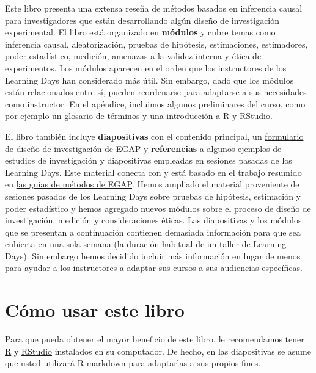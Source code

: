 \documentclass[
  12pt,
  spanish,
]{book}
\begin{document}
Este libro presenta una extensa reseña de métodos basados en inferencia causal para investigadores que están desarrollando algún diseño de investigación experimental. El libro está organizado en \textbf{módulos} y cubre temas como inferencia causal, aleatorización, pruebas de hipótesis, estimaciones, estimadores, poder estadístico, medición, amenazas a la validez interna y ética de experimentos. Los módulos aparecen en el orden que los instructores de los Learning Days han considerado más útil. Sin embargo, dado que los módulos están relacionados entre sí, pueden reordenarse para adaptarse a sus necesidades como instructor. En el apéndice, incluimos algunos preliminares del curso, como por ejemplo un \href{glosario-de-términos.html}{glosario de términos} y \href{introducción-a-r-y-rstudio.html}{una introducción a R y RStudio}.

El libro también incluye \textbf{diapositivas} con el contenido principal, un \href{researchdesignform.html}{formulario de diseño de investigación de EGAP} y \textbf{referencias} a algunos ejemplos de estudios de investigación y diapositivas empleadas en sesiones pasadas de los Learning Days. Este material conecta con y está basado en el trabajo resumido en \href{https://egap.org/methods-guides/}{las guías de métodos de EGAP}. Hemos ampliado el material proveniente de sesiones pasados de los Learning Days sobre pruebas de hipótesis, estimación y poder estadístico y hemos agregado nuevos módulos sobre el proceso de diseño de investigación, medición y consideraciones éticas. Las diapositivas y los módulos que se presentan a continuación contienen demasiada información para que sea cubierta en una sola semana (la duración habitual de un taller de Learning Days). Sin embargo hemos decidido incluir más información en lugar de menos para ayudar a los instructores a adaptar sus cursos a sus audiencias específicas.

\hypertarget{cuxf3mo-usar-este-libro}{%
\section{Cómo usar este libro}\label{cuxf3mo-usar-este-libro}}

Para que pueda obtener el mayor beneficio de este libro, le recomendamos tener \href{https://cran.r-project.org/}{R} y \href{https://www.rstudio.com/products/rstudio/download/}{RStudio} instalados en su computador. De hecho, en las diapositivas se asume que usted utilizará R markdown para adaptarlas a sus propios fines.
\end{document}

